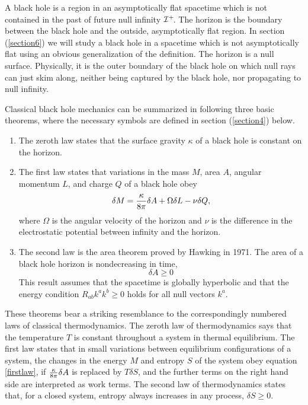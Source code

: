 \documentclass[12pt]{article}
\newcommand{\be}{\begin{equation}}
\newcommand{\ee}{\end{equation}}
\def\finf{{\cal I}^+}
\begin{document}
A black hole is a region in an asymptotically flat spacetime which is not
contained in the
past of future null infinity $\finf\!$.  The horizon is the
boundary between the black hole and the outside, asymptotically flat region.
In section (\ref{section6}) we will study a black hole in a spacetime which is not
asymptotically flat using an obvious generalization of the definition.
The horizon is a null surface. Physically, it is the outer boundary of the
black hole on which
null rays can just skim along, neither being captured by the black hole,
nor propagating
to null infinity.

Classical black hole mechanics can be summarized in following three basic
theorems, where the
necessary symbols are defined in section (\ref{section4}) below.

\begin{enumerate}
\item The zeroth law states that the surface gravity $\kappa$ of a black hole is
constant on the horizon. 

\item The first law states that variations in
the mass $M$, area $A$, angular momentum $L$, and charge $Q$ of a black hole
obey \cite{bch,carter}
%
\be\label{firstlaw}\delta M ={\kappa \over 8\pi } \delta A +\Omega \delta L
-\nu \delta Q,\ee
%
where $\Omega$ is the angular velocity of the horizon and $\nu$
is the difference in the electrostatic potential between infinity and
the horizon.

\item The second law is
the area theorem \cite{area} proved by Hawking in 1971. The area of a black
hole horizon is nondecreasing in time,
%
\be\label{areath}\delta A \ge 0\ee
%
This result assumes that the spacetime is globally
hyperbolic and that the energy condition $R_{ab}k^a k^b \ge 0 $ holds for all
null vectors $k^a$.
\end{enumerate}

\noindent
These theorems bear a striking resemblance to the correspondingly numbered
laws of classical thermodynamics.  The zeroth law of thermodynamics says
that the temperature
$T$ is constant throughout a system in thermal equilibrium. The first law
states that in
small variations between equilibrium configurations of a system, the
changes in the energy $M$ and entropy $S$ of the system obey equation
\ref{firstlaw}, if
${\kappa \over 8\pi} \delta A$ is replaced by $T\delta S$, and the further
terms on the
right hand side are interpreted as work terms.  The second law of thermodynamics
states that, for a closed system, entropy always increases in any process,
$\delta S \ge 0$.
\end{document}
